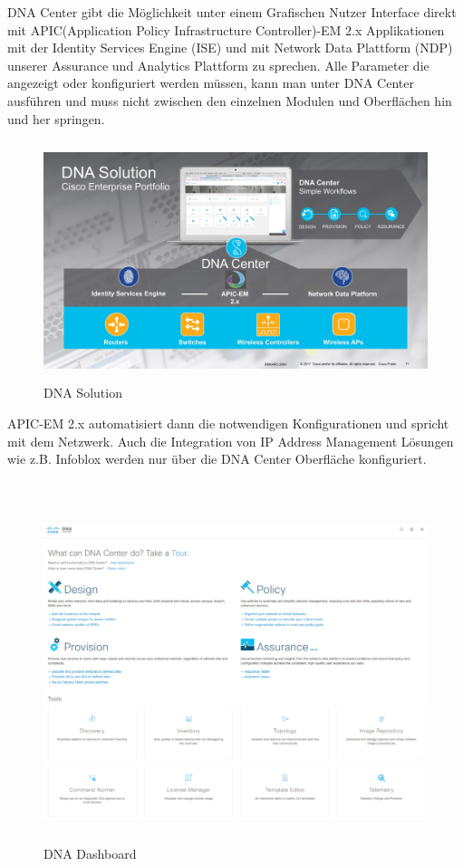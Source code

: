 DNA Center gibt die Möglichkeit unter einem Grafischen Nutzer Interface direkt mit APIC(Application Policy Infrastructure Controller)-EM 2.x Applikationen mit der Identity Services Engine (ISE) und mit Network Data Plattform (NDP) unserer Assurance und Analytics Plattform zu sprechen. Alle Parameter die angezeigt oder konfiguriert werden müssen, kann man unter DNA Center ausführen und muss nicht zwischen den einzelnen Modulen und Oberflächen hin und her springen.
\begin{figure}[H]
	\centering
	\includegraphics[height=7cm]{img/DNAC-1.jpg}
	\caption{DNA Solution}
	\label{fig:Aufbau einer DNA Solution}
\end{figure}
APIC-EM 2.x automatisiert dann die notwendigen Konfigurationen und spricht mit dem Netzwerk. Auch die Integration von IP Address Management Lösungen wie z.B. Infoblox werden nur über die DNA Center Oberfläche konfiguriert. \\
\\
\begin{figure}[H]
	\centering
	\includegraphics[height=10cm]{img/DNA-Dashboard.png}
	\caption{DNA Dashboard}
	\label{fig:DNA Dashboard}
\end{figure}

